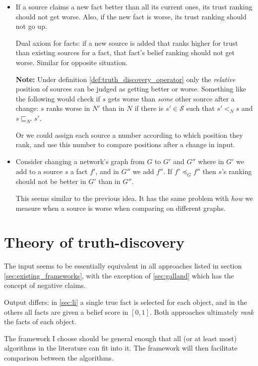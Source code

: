 \documentclass{article}
\theoremstyle{definition} \newtheorem{definition}{Definition}
\theoremstyle{definition} \newtheorem{example}{Example}
\theoremstyle{plain} \newtheorem{axiom}{Axiom}
\theoremstyle{plain} \newtheorem*{remark}{Remark}
\theoremstyle{remark} \newtheorem*{notation}{Notation}
\theoremstyle{plain} \newtheorem{lemma}{Lemma}
\theoremstyle{plain} \newtheorem{proposition}{Proposition}
\renewcommand{\S}{\mathcal{S}}  %
\newcommand{\sle}{\sqsubseteq}
\newcommand{\fle}{\preceq}
\begin{document}
\begin{itemize}
\item If a source claims a new fact better than all its current ones, its trust
ranking should not get worse. Also, if the new fact is worse, its trust ranking
should not go up.

Dual axiom for facts: if a new source is added that ranks higher for trust than
existing sources for a fact, that fact's belief ranking should not get worse.
Similar for opposite situation.

\textbf{Note:} Under definition \ref{def:truth_discovery_operator} only the
\emph{relative} position of sources can be judged as getting better or worse.
Something like the following would check if $s$ gets worse than \emph{some}
other source after a change: $s$ ranks worse in $N'$ than in $N$ if there is
$s' \in \S$ such that $s' <_N s$ and $s \sle_{N'} s'$.

Or we could assign each source a number according to which position they rank,
and use this number to compare positions after a change in input.

\item Consider changing a network's graph from $G$ to $G'$ and $G''$ where in
$G'$ we add to a source $s$ a fact $f'$, and in $G''$ we add $f''$. If $f'
\fle_G f''$ then $s$'s ranking should not be better in $G'$ than in $G''$.

This seems similar to the previous idea. It has the same problem with
\emph{how} we measure when a source is worse when comparing on different graphs.

\end{itemize}

\section{Theory of truth-discovery}

The input seems to be essentially equivalent in all approaches listed in
section \ref{sec:existing_frameworks}, with the exception of \ref{sec:galland}
which has the concept of negative claims.

Output differs: in \ref{sec:li} a single true fact is selected for each object,
and in the others all facts are given a belief score in $[0, 1]$. Both
approaches ultimately \emph{rank} the facts of each object.

The framework I choose should be general enough that all (or at least most)
algorithms in the literature can fit into it. The framework will then
facilitate comparison between the algorithms.
\end{document}
